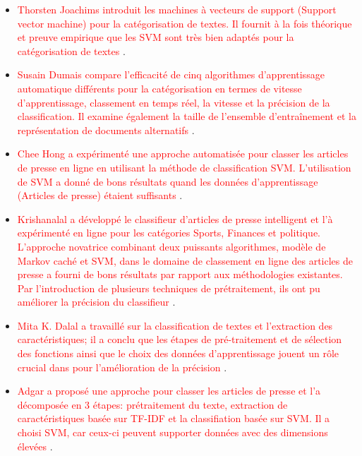     \begin{itemize}
     	
     \item  \textcolor{red}{Thorsten Joachims introduit les machines à vecteurs de support (Support vector machine) pour la catégorisation de textes. Il fournit à la fois théorique et preuve empirique que les SVM sont très bien adaptés pour la catégorisation de textes \cite{itemetat1}}. 
     
     \item  \textcolor{red}{Susain Dumais compare l'efficacité de cinq algorithmes d'apprentissage automatique différents pour la catégorisation en termes de vitesse d'apprentissage, classement en temps réel, la vitesse et la précision de la classification. Il examine également la taille de l'ensemble d'entraînement et la représentation de documents alternatifs \cite{itemetat2}}.
     
     \item  \textcolor{red}{Chee Hong a expérimenté une approche automatisée pour classer les articles de presse en ligne en utilisant la méthode de classification SVM. L'utilisation de SVM a donné de bons résultats quand les données d'apprentissage (Articles de presse) étaient suffisants \cite{itemetat3}}.
      
     \item  \textcolor{red}{Krishanalal a développé le classifieur d'articles de presse intelligent et l'à expérimenté en ligne pour les catégories Sports, Finances et politique. L'approche novatrice combinant deux puissants algorithmes, modèle de Markov caché et SVM, dans le domaine de classement en ligne des articles de presse a fourni de bons résultats par rapport aux méthodologies existantes. Par l'introduction de plusieurs techniques de prétraitement, ils ont pu améliorer la précision du classifieur \cite{itemetat6}}.
     
     \item  \textcolor{red}{Mita K. Dalal a travaillé sur la classification de textes et l'extraction des caractéristiques; il a conclu que les étapes de pré-traitement et de sélection des fonctions ainsi que le choix des données d'apprentissage jouent un rôle crucial dans pour l'amélioration de la précision \cite{itemetat7}}. 
     
     \item  \textcolor{red}{Adgar a proposé une approche pour classer les articles de presse et l'a décomposée en 3 étapes: prétraitement du texte, extraction de caractéristiques basée sur TF-IDF et la classifiation basée sur SVM.
     Il a choisi SVM, car ceux-ci peuvent supporter données avec des dimensions élevées \cite{itemetat8}}.
     
     \end{itemize}
     	

